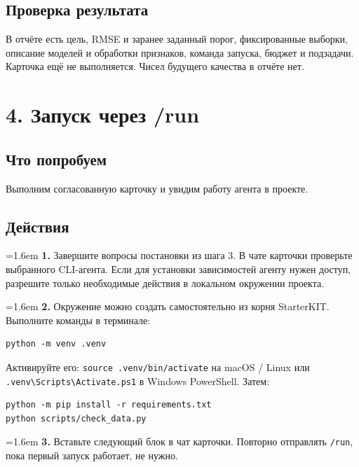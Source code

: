\documentclass[10pt,a4paper]{article}
\begin{document}
\subsection*{Проверка результата}
В отчёте есть цель, RMSE и заранее заданный порог, фиксированные выборки, описание моделей и обработки признаков, команда запуска, бюджет и подзадачи. Карточка ещё не выполняется. Чисел будущего качества в отчёте нет.


\clearpage
\section{4. Запуск через /run}
\subsection*{Что попробуем}
Выполним согласованную карточку и увидим работу агента в проекте.

\subsection*{Действия}
\par\noindent\hangindent=1.6em \textbf{1.} Завершите вопросы постановки из шага 3. В чате карточки проверьте выбранного CLI-агента. Если для установки зависимостей агенту нужен доступ, разрешите только необходимые действия в локальном окружении проекта.\par
\par\noindent\hangindent=1.6em \textbf{2.} Окружение можно создать самостоятельно из корня StarterKIT. Выполните команды в терминале:\par
\begin{promptbox}
\begin{Verbatim}
python -m venv .venv
\end{Verbatim}
\end{promptbox}
Активируйте его: \texttt{source .venv/bin/activate} на macOS / Linux или \texttt{.venv\textbackslash{}Scripts\textbackslash{}Activate.ps1} в Windows PowerShell. Затем:

\begin{promptbox}
\begin{Verbatim}
python -m pip install -r requirements.txt
python scripts/check_data.py
\end{Verbatim}
\end{promptbox}
\par\noindent\hangindent=1.6em \textbf{3.} Вставьте следующий блок в чат карточки. Повторно отправлять \texttt{/run}, пока первый запуск работает, не нужно.\par
\end{document}
